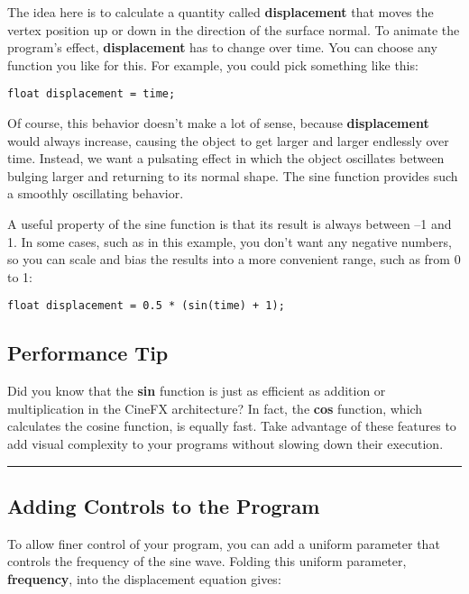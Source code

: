 \documentclass[../main.tex]{subfiles}
\begin{document}
The idea here is to calculate a quantity called \textbf{displacement} that moves the vertex position up or down in the direction of the surface normal. To animate the program's effect, \textbf{displacement} has to change over time. You can choose any function you like for this. For example, you could pick something like this:

\FloatBarrier
\begin{lstlisting}
float displacement = time;
\end{lstlisting}
\FloatBarrier

Of course, this behavior doesn't make a lot of sense, because \textbf{displacement} would always increase, causing the object to get larger and larger endlessly over time. Instead, we want a pulsating effect in which the object oscillates between bulging larger and returning to its normal shape. The sine function provides such a smoothly oscillating behavior.

A useful property of the sine function is that its result is always between –1 and 1. In some cases, such as in this example, you don't want any negative numbers, so you can scale and bias the results into a more convenient range, such as from 0 to 1:

\FloatBarrier
\begin{lstlisting}
float displacement = 0.5 * (sin(time) + 1);
\end{lstlisting}
\FloatBarrier

\subsection*{Performance Tip}

Did you know that the \textbf{sin} function is just as efficient as addition or multiplication in the CineFX architecture? In fact, the \textbf{cos} function, which calculates the cosine function, is equally fast. Take advantage of these features to add visual complexity to your programs without slowing down their execution.
\hrule

\subsection*{Adding Controls to the Program}

To allow finer control of your program, you can add a uniform parameter that controls the frequency of the sine wave. Folding this uniform parameter, \textbf{frequency}, into the displacement equation gives:
\end{document}
